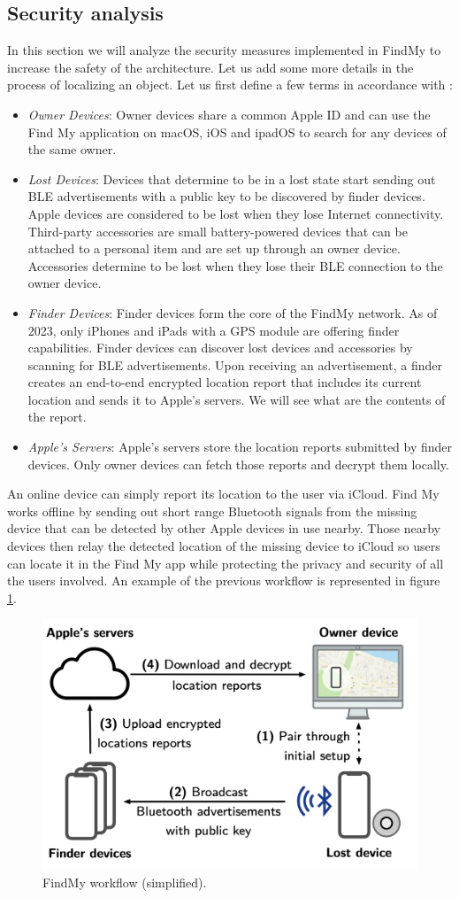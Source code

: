 \documentclass[english]{article}
\begin{document}
\subsection{Security analysis}
In this section we will analyze the security measures implemented in FindMy to increase the safety of the architecture. Let us add some more details in the process of localizing an object.
Let us first define a few terms in accordance with \cite{whocanfind}:
\begin{itemize}
  \item \textit{Owner Devices}: Owner devices share a common Apple ID and can use the Find My application on macOS, iOS and ipadOS to search for any devices of the same owner.
  \item \textit{Lost Devices}: Devices that determine to be in a lost state start sending out BLE advertisements with a public key to be discovered by finder devices. Apple devices are considered to be lost when they lose Internet connectivity. Third-party accessories \cite{gadget} are small battery-powered devices that can be attached to a personal item and are set up through an owner device. Accessories determine to be lost when they lose their BLE connection to the owner device.
  \item \textit{Finder Devices}: Finder devices form the core of the FindMy network. As of 2023, only iPhones and iPads with a GPS module are offering finder capabilities. Finder devices can discover lost devices and accessories by scanning for BLE advertisements. Upon receiving an advertisement, a finder creates an end-to-end encrypted location report that includes its current location and
  sends it to Apple’s servers. We will see what are the contents of the report.
  \item \textit{Apple’s Servers}: Apple’s servers store the location reports submitted by finder devices. Only owner devices can fetch those reports and decrypt them locally.
\end{itemize}
An online device can simply report its location to the user via iCloud. Find My works offline by sending out short range Bluetooth signals from the missing device that can be detected by other Apple devices in use nearby. Those nearby devices then relay the detected location of the missing device to iCloud so users can locate it in the Find My app while protecting the privacy and security of all the users involved. An example of the previous workflow is represented in figure \ref{process}.

\begin{figure}[]
	\centering
	\includegraphics[width=.5\textwidth]{images/process.png}
	\caption{FindMy workflow (simplified).}
	\label{process}
\end{figure}
\end{document}
